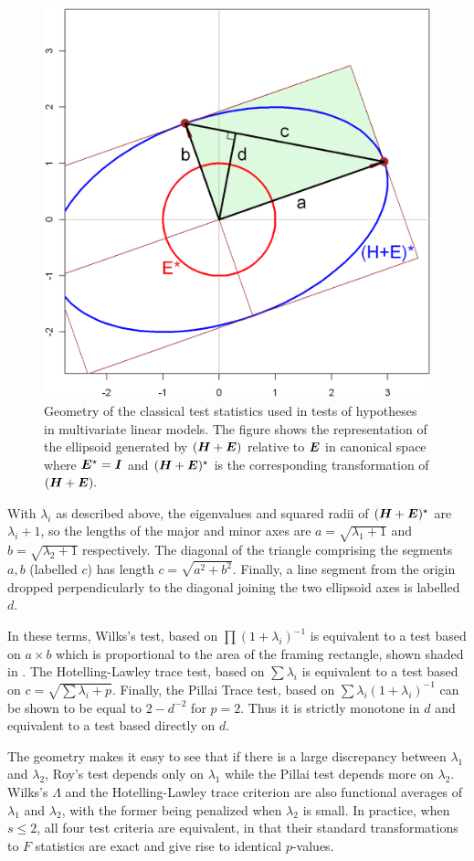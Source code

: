 \begin{figure}[htb]
  \centering
  \includegraphics[width=.5\textwidth,clip]{fig/mtests}
  \caption{Geometry of the classical test statistics used in tests of hypotheses in multivariate linear models.
  The figure shows the representation of the ellipsoid generated by $(\bm{H} + \bm{E})$ relative to $\bm{E}$
  in canonical space where $\bm{E}^\star = \bm{I}$ and $(\bm{H}+\bm{E})^\star$ is the corresponding transformation
  of $(\bm{H} + \bm{E}).$
  }%
  \label{fig:mtests}
\end{figure}

With $\lambda_i$ as described above, 
the eigenvalues and squared radii of $(\bm{H}+\bm{E})^\star$ are $\lambda_i + 1$,
so the lengths of the major and minor axes are  $a=\sqrt{\lambda_1 + 1}$ and $b=\sqrt{\lambda_2 + 1}$ respectively.
The diagonal of the triangle comprising the segments $a, b$ (labelled $c$) has length
$c = \sqrt{a^2 + b^2}$.
Finally, a line segment from the origin dropped perpendicularly to the diagonal joining the two ellipsoid axes is labelled $d$.

In these terms, 
Wilks's test, based on $\prod{(1+\lambda_i)^{-1}}$ is equivalent to a test based on
$a \times b$ which is proportional to the area of the framing rectangle, shown shaded in .
The Hotelling-Lawley trace test, based on
$\sum{\lambda_i}$ 
is equivalent to a test based on 
$c=\sqrt{\sum{\lambda_i} + p}$.
Finally, the Pillai Trace test, based on $\sum{\lambda_i (1+\lambda_i)^{-1}}$  can be shown to be equal to 
$2-d^{-2}$ for $p=2$. Thus it is strictly monotone in $d$ and equivalent to a test based directly on $d$.

The geometry makes it easy to see that if there is a large discrepancy between $\lambda_1$ and $\lambda_2$, Roy's test depends 
only on $\lambda_1$ 
while the Pillai test depends more on $\lambda_2$. 
Wilks's $\Lambda$ and the Hotelling-Lawley trace criterion are also functional averages of $\lambda_1$ and $\lambda_2$, with the 
former being penalized when $\lambda_2$ is small.  In practice, when $s \le 2$, all four test criteria are equivalent, in that
their standard transformations to $F$ statistics are exact and give rise to identical $p$-values.



